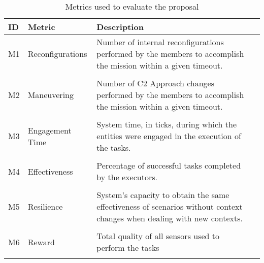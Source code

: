 \begin{table}[ht!]
	\small
	\fontsize{10}{10}\selectfont
	\centering
	\caption{Metrics used to evaluate the proposal}
	\label{table:metrics}
	
	\begin{tabularx}{\textwidth}{llXX}
	\hline
		\textbf{ID}
		& \textbf{Metric}
		& \textbf{Description} \\ [1ex]
	\hline	
	
	M1 & Reconfigurations & Number of internal reconfigurations performed by the members to accomplish the mission within a given timeout.
	\\[1ex] \\
	
	M2 & Maneuvering & Number of C2 Approach changes performed by the members to accomplish the mission within a given timeout.
	\\[1ex] \\
	
	M3 & Engagement Time & System time, in ticks, during which the entities were engaged in the execution of the tasks.
	\\[1ex] \\
	
	M4 & Effectiveness &  Percentage of successful tasks completed by the executors.
	\\[1ex] \\
	
	M5 & Resilience & System's capacity to obtain the same effectiveness of scenarios without context changes when dealing with new contexts.
	\\[1ex] \\
	
	M6 & Reward & Total quality of all sensors used to perform the tasks\\ 
	\\[1ex]
	\hline
	\end{tabularx}
\end{table} 